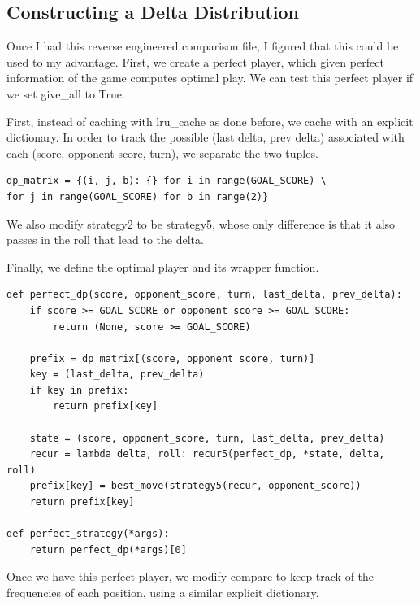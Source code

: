 \documentclass[11pt, oneside]{article}
\begin{document}
\subsection{Constructing a Delta Distribution}

Once I had this reverse engineered comparison file, I figured
that this could be used to my advantage.
First, we create a perfect player, which given perfect information 
of the game computes optimal play. We can test this perfect player
if we set give\_all to True.

First, instead of caching with lru\_cache as done before,
we cache with an explicit dictionary.
In order to track the possible (last delta, prev delta)
associated with each (score, opponent score, turn),
we separate the two tuples.
\begin{verbatim}
dp_matrix = {(i, j, b): {} for i in range(GOAL_SCORE) \
for j in range(GOAL_SCORE) for b in range(2)}
\end{verbatim} 

We also modify strategy2 to be strategy5, whose only difference
is that it also passes in the roll that lead to the delta.

Finally, we define the optimal player and its wrapper function.

\begin{verbatim}
def perfect_dp(score, opponent_score, turn, last_delta, prev_delta):
    if score >= GOAL_SCORE or opponent_score >= GOAL_SCORE:
        return (None, score >= GOAL_SCORE)

    prefix = dp_matrix[(score, opponent_score, turn)]
    key = (last_delta, prev_delta)
    if key in prefix:
        return prefix[key] 

    state = (score, opponent_score, turn, last_delta, prev_delta)
    recur = lambda delta, roll: recur5(perfect_dp, *state, delta, roll)
    prefix[key] = best_move(strategy5(recur, opponent_score))
    return prefix[key]

def perfect_strategy(*args):
    return perfect_dp(*args)[0]
\end{verbatim} 

Once we have this perfect player, we modify compare to keep track of 
the frequencies of each position, using a similar explicit dictionary. 
\end{document}
